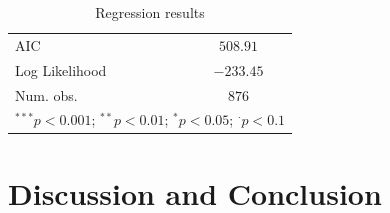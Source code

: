 \documentclass[preprint, 3p,
authoryear]{elsarticle} %
\begin{document}
\begin{table}
\begin{center}
\begin{footnotesize}
\begin{tabular}{l c}
\hline
AIC                                                                           & $508.91$        \\
Log Likelihood                                                                & $-233.45$       \\
Num. obs.                                                                     & $876$           \\
\hline
\multicolumn{2}{l}{\tiny{$^{***}p<0.001$; $^{**}p<0.01$; $^{*}p<0.05$; $^{\cdot}p<0.1$}}
\end{tabular}
\end{footnotesize}
\caption{Regression results}
\label{tab:regression_results}
\end{center}
\end{table}

\section{Discussion and Conclusion}\label{discussion-and-conclusion}

\renewcommand\refname{References}

\end{document}
